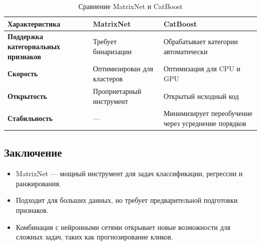 \begin{table}[h!]
    \centering
    \renewcommand{\arraystretch}{1.2}
    \setlength{\tabcolsep}{8pt}
    \begin{tabular}{|p{3.5cm}|p{4.5cm}|p{4.5cm}|}
        \hline
        \textbf{Характеристика}                     & \textbf{MatrixNet}          & \textbf{CatBoost}                                   \\ \hline
        \textbf{Поддержка категориальных признаков} & Требует бинаризации         & Обрабатывает категории автоматически                \\ \hline
        \textbf{Скорость}                           & Оптимизирован для кластеров & Оптимизация для CPU и GPU                           \\ \hline
        \textbf{Открытость}                         & Проприетарный инструмент    & Открытый исходный код                               \\ \hline
        \textbf{Стабильность}                       & ---                         & Минимизирует переобучение через усреднение порядков \\ \hline
    \end{tabular}
    \caption{Сравнение MatrixNet и CatBoost}
    \label{tab:matrixnet_vs_catboost}
\end{table}

\subsection{Заключение}
\begin{itemize}
    \item MatrixNet — мощный инструмент для задач классификации, регрессии и ранжирования.
    \item Подходит для больших данных, но требует предварительной подготовки признаков.
    \item Комбинация с нейронными сетями открывает новые возможности для сложных задач, таких как прогнозирование кликов.
\end{itemize}

